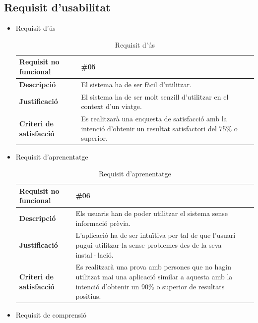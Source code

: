 \subsection{Requisit d'usabilitat}
\begin{itemize}

\item{Requisit d'ús}

\begin{table}[!h]
\centering
\begin{tabular}{|l|M|}
\hline
\textbf{Requisit no funcional }& \#05    \\ \hline
\textbf{Descripció} & El sistema ha de ser fàcil d’utilitzar.
 \\ \hline
\textbf{Justificació} &El sistema ha de ser molt senzill d’utilitzar en el context d’un viatge.\\ \hline
\textbf{Criteri de satisfacció} & Es realitzarà una enquesta de satisfacció amb la intenció d’obtenir un resultat satisfactori del 75\% o superior.
  \\ \hline
\end{tabular}
\label{}
\caption{Requisit d'ús}
\end{table}

\item{Requisit d'aprenentatge}

\begin{table}[!h]
\centering
\begin{tabular}{|l|M|}
\hline
\textbf{Requisit no funcional }& \#06   \\ \hline
\textbf{Descripció} &  Els usuaris han de poder utilitzar el sistema sense informació prèvia. \\ \hline
\textbf{Justificació} & L’aplicació ha de ser intuïtiva per tal de que l’usuari
pugui utilitzar-la sense problemes des de la seva instal·lació.   \\ \hline
\textbf{Criteri de satisfacció} & Es realitzarà una prova amb persones que no hagin utilitzat mai una aplicació similar a aquesta amb la
intenció d’obtenir un 90\% o superior de resultats positius.
  \\ \hline
\end{tabular}
\label{}
\caption{Requisit d'aprenentatge}
\end{table}

\clearpage

\item{Requisit de comprensió}


\end{itemize}
